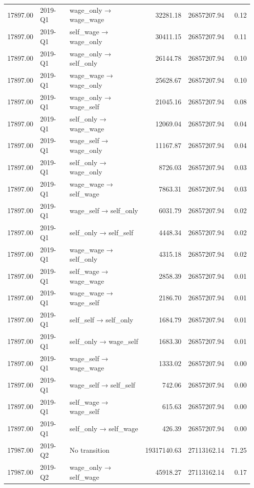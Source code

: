 \begin{table}[ht]
{\begin{tabular}{rllrrr}
  17897.00 & 2019-Q1 & wage\_only → wage\_wage & 32281.18 & 26857207.94 & 0.12 \\ 
  17897.00 & 2019-Q1 & self\_wage → wage\_only & 30411.15 & 26857207.94 & 0.11 \\ 
  17897.00 & 2019-Q1 & wage\_only → self\_only & 26144.78 & 26857207.94 & 0.10 \\ 
  17897.00 & 2019-Q1 & wage\_wage → wage\_only & 25628.67 & 26857207.94 & 0.10 \\ 
  17897.00 & 2019-Q1 & wage\_only → wage\_self & 21045.16 & 26857207.94 & 0.08 \\ 
  17897.00 & 2019-Q1 & self\_only → wage\_wage & 12069.04 & 26857207.94 & 0.04 \\ 
  17897.00 & 2019-Q1 & wage\_self → wage\_only & 11167.87 & 26857207.94 & 0.04 \\ 
  17897.00 & 2019-Q1 & self\_only → wage\_only & 8726.03 & 26857207.94 & 0.03 \\ 
  17897.00 & 2019-Q1 & wage\_wage → self\_wage & 7863.31 & 26857207.94 & 0.03 \\ 
  17897.00 & 2019-Q1 & wage\_self → self\_only & 6031.79 & 26857207.94 & 0.02 \\ 
  17897.00 & 2019-Q1 & self\_only → self\_self & 4448.34 & 26857207.94 & 0.02 \\ 
  17897.00 & 2019-Q1 & wage\_wage → self\_only & 4315.18 & 26857207.94 & 0.02 \\ 
  17897.00 & 2019-Q1 & self\_wage → wage\_wage & 2858.39 & 26857207.94 & 0.01 \\ 
  17897.00 & 2019-Q1 & wage\_wage → wage\_self & 2186.70 & 26857207.94 & 0.01 \\ 
  17897.00 & 2019-Q1 & self\_self → self\_only & 1684.79 & 26857207.94 & 0.01 \\ 
  17897.00 & 2019-Q1 & self\_only → wage\_self & 1683.30 & 26857207.94 & 0.01 \\ 
  17897.00 & 2019-Q1 & wage\_self → wage\_wage & 1333.02 & 26857207.94 & 0.00 \\ 
  17897.00 & 2019-Q1 & wage\_self → self\_self & 742.06 & 26857207.94 & 0.00 \\ 
  17897.00 & 2019-Q1 & self\_wage → wage\_self & 615.63 & 26857207.94 & 0.00 \\ 
  17897.00 & 2019-Q1 & self\_only → self\_wage & 426.39 & 26857207.94 & 0.00 \\ 
  17987.00 & 2019-Q2 & No transition & 19317140.63 & 27113162.14 & 71.25 \\ 
  17987.00 & 2019-Q2 & wage\_only → self\_wage & 45918.27 & 27113162.14 & 0.17 \\ 

\end{tabular}}
\end{table}
